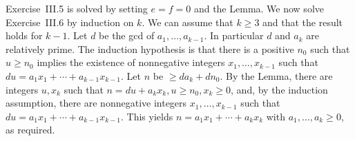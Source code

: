 \documentclass[12pt,letterpaper]{article}
\begin{document}
Exercise~III.5 is solved by setting $e=f=0$ and the Lemma. We now solve Exercise~III.6 by induction on $k$. We can assume that $k\ge3$ and that the result holds for $k-1$. Let $d$ be the gcd of $a_1,\ldots,a_{k-1}$. In particular $d$ and $a_k$ are relatively prime. The induction hypothesis is that there is a positive $n_0$ such that $u\ge n_0$ implies the existence of nonnegative integers $x_1,\ldots,x_{k-1}$ such that $du=a_1x_1+\cdots+a_{k-1}x_{k-1}$. Let $n$ be $\ge da_k+dn_0$. By the Lemma, there are integers $u,x_k$ such that $n=du+a_kx_k,u\ge n_0,x_k\ge0$, and, by the induction assumption, there are nonnegative integers $x_1,\ldots,x_{k-1}$ such that $du=a_1x_1+\cdots+a_{k-1}x_{k-1}$. This yields $n=a_1x_1+\cdots+a_kx_k$ with $a_1,\ldots,a_k\ge0$, as required. 

\printbibliography
\end{document}
